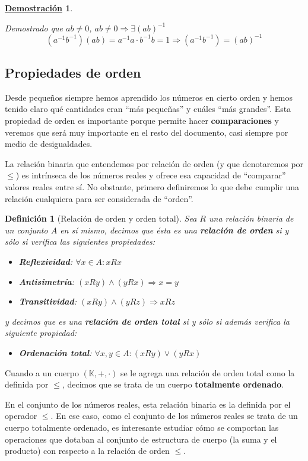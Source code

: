\documentclass[10pt,a4paper,openright]{book}
\theoremstyle{break}
\newtheorem{defi}{Definición}[chapter]
\newtheorem*{demo}{\underline{Demostración}}
\begin{document}
\begin{demo}
\begin{enumerate}
Demostrado que $ab\neq 0$, $ab\neq 0\Rightarrow \exists (ab)^{-1}$
$$(a^{-1}b^{-1})(ab)=a^{-1} a \cdot b^{-1} b=1 \Rightarrow (a^{-1}b^{-1})=(ab)^{-1}$$
\end{enumerate}
\end{demo}

\subsection{Propiedades de orden}
Desde pequeños siempre hemos aprendido los números en cierto orden y hemos tenido claro qué cantidades eran ``más pequeñas'' y cuáles ``más grandes''. Esta propiedad de orden es importante porque permite hacer \textbf{comparaciones} y veremos que será muy importante en el resto del documento, casi siempre por medio de desigualdades.

La relación binaria que entendemos por relación de orden (y que denotaremos por $\leq$) es intrínseca de los números reales y ofrece esa capacidad de ``comparar'' valores reales entre sí. No obstante, primero definiremos lo que debe cumplir una relación cualquiera para ser considerada de ``orden''.

\begin{defi}[Relación de orden y orden total]
Sea $R$ una relación binaria de un conjunto $A$ en sí mismo, decimos que ésta es una \textbf{relación de orden} si y sólo si verifica las siguientes propiedades:
\begin{itemize}
\item \textbf{Reflexividad}: $\forall x\in  A: x R x$
\item \textbf{Antisimetría}: $(xR y) \wedge (yR x) \Rightarrow x=y$
\item \textbf{Transitividad}: $(xR y) \wedge (y R z) \Rightarrow xR z$
\end{itemize}
y decimos que es una \textbf{relación de orden total} si y sólo si además verifica la siguiente propiedad:
\begin{itemize}
\item \textbf{Ordenación total}: $\forall x,y\in A: (xR y) \vee (yR x)$
\end{itemize}
\end{defi}

Cuando a un cuerpo $(\mathbb K, +, \cdot)$ se le agrega una relación de orden total como la definida por $\leq$, decimos que se trata de un cuerpo \textbf{totalmente ordenado}.

En el conjunto de los números reales, esta relación binaria es la definida por el operador $\leq$. En ese caso, como el conjunto de los números reales se trata de un cuerpo totalmente ordenado, es interesante estudiar cómo se comportan las operaciones que dotaban al conjunto de estructura de cuerpo (la suma y el producto) con respecto a la relación de orden $\leq$.
\end{document}

